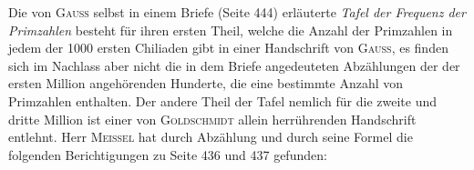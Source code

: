 \par Die von \textsc{Gauss} selbst in einem Briefe (Seite 444) erläuterte \textit{Tafel der Frequenz der Primzahlen} besteht für ihren ersten Theil, welche die Anzahl der Primzahlen in jedem der 1000 ersten Chiliaden gibt in einer Handschrift von \textsc{Gauss}, es finden sich im Nachlass aber nicht die in dem Briefe angedeuteten Abzählungen der der ersten Million angehörenden Hunderte, die eine bestimmte Anzahl von Primzahlen enthalten. Der andere Theil der Tafel nemlich für die zweite und dritte Million ist einer von \textsc{Goldschmidt} allein herrührenden Handschrift entlehnt. Herr \textsc{Meissel} hat durch Abzählung und durch seine Formel die folgenden Berichtigungen zu Seite 436 und 437 gefunden:
